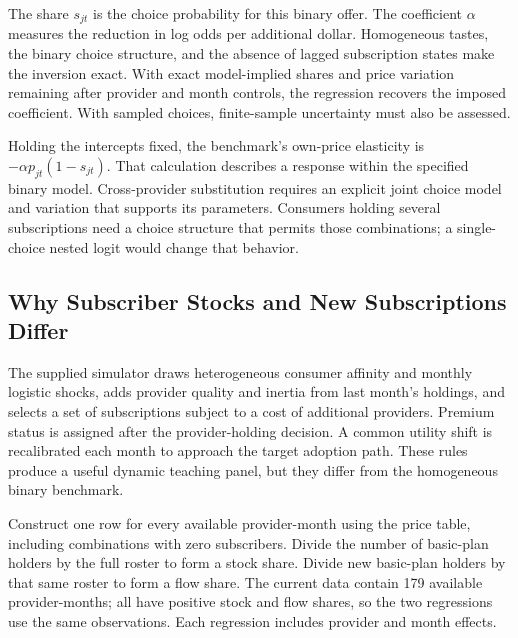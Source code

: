 The share \(s_{jt}\) is the choice probability for this binary offer.
The coefficient \(\alpha\) measures the reduction in log odds per
additional dollar. Homogeneous tastes, the binary choice structure, and
the absence of lagged subscription states make the inversion exact. With
exact model-implied shares and price variation remaining after provider
and month controls, the regression recovers the imposed coefficient.
With sampled choices, finite-sample uncertainty must also be assessed.

Holding the intercepts fixed, the benchmark's own-price elasticity is
\(-\alpha p_{jt}(1-s_{jt})\). That calculation describes a response
within the specified binary model. Cross-provider substitution requires
an explicit joint choice model and variation that supports its
parameters. Consumers holding several subscriptions need a choice
structure that permits those combinations; a single-choice nested logit
would change that behavior.

\hypertarget{M08-why-subscriber-stocks-and-new-subscriptions-differ}{%
\subsection{Why Subscriber Stocks and New Subscriptions
Differ}\label{M08-why-subscriber-stocks-and-new-subscriptions-differ}}

\noindent The supplied simulator draws heterogeneous consumer affinity and monthly
logistic shocks, adds provider quality and inertia from last month's
holdings, and selects a set of subscriptions subject to a cost of
additional providers. Premium status is assigned after the
provider-holding decision. A common utility shift is recalibrated each
month to approach the target adoption path. These rules produce a useful
dynamic teaching panel, but they differ from the homogeneous binary
benchmark.

Construct one row for every available provider-month using the price
table, including combinations with zero subscribers. Divide the number
of basic-plan holders by the full roster to form a stock share. Divide
new basic-plan holders by that same roster to form a flow share. The
current data contain 179 available provider-months; all have positive
stock and flow shares, so the two regressions use the same observations.
Each regression includes provider and month effects.

